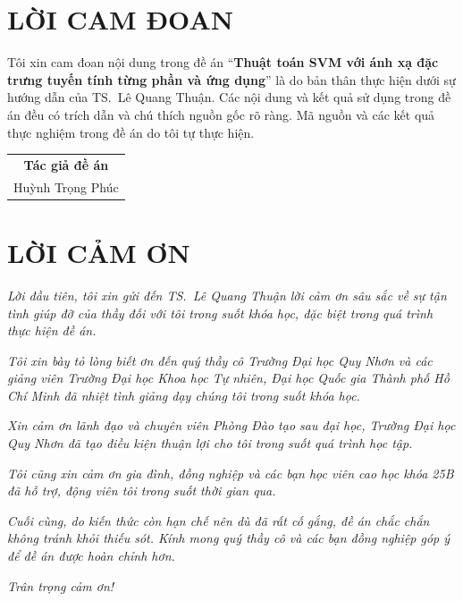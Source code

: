 \chapter*{LỜI CAM ĐOAN}

Tôi xin cam đoan nội dung trong đề án “\textbf{Thuật toán SVM với ánh xạ đặc trưng tuyến tính từng phần và ứng dụng}” là do bản thân thực hiện dưới sự hướng dẫn của TS.~Lê Quang Thuận. Các nội dung và kết quả sử dụng trong đề án đều có trích dẫn và chú thích nguồn gốc rõ ràng. Mã nguồn và các kết quả thực nghiệm trong đề án do tôi tự thực hiện.

\vspace{1.5cm}
\begin{flushright}
\begin{tabular}{c}
\textbf{Tác giả đề án}\\[2.2cm]
Huỳnh Trọng Phúc
\end{tabular}
\end{flushright}

\chapter*{LỜI CẢM ƠN}

\textit{Lời đầu tiên, tôi xin gửi đến TS.~Lê Quang Thuận lời cảm ơn sâu sắc về sự tận tình giúp đỡ của thầy đối với tôi trong suốt khóa học, đặc biệt trong quá trình thực hiện đề án.}

\textit{Tôi xin bày tỏ lòng biết ơn đến quý thầy cô Trường Đại học Quy Nhơn và các giảng viên Trường Đại học Khoa học Tự nhiên, Đại học Quốc gia Thành phố Hồ Chí Minh đã nhiệt tình giảng dạy chúng tôi trong suốt khóa học.}

\textit{Xin cảm ơn lãnh đạo và chuyên viên Phòng Đào tạo sau đại học, Trường Đại học Quy Nhơn đã tạo điều kiện thuận lợi cho tôi trong suốt quá trình học tập.}

\textit{Tôi cũng xin cảm ơn gia đình, đồng nghiệp và các bạn học viên cao học khóa 25B đã hỗ trợ, động viên tôi trong suốt thời gian qua.}

\textit{Cuối cùng, do kiến thức còn hạn chế nên dù đã rất cố gắng, đề án chắc chắn không tránh khỏi thiếu sót. Kính mong quý thầy cô và các bạn đồng nghiệp góp ý để đề án được hoàn chỉnh hơn.}

\textit{Trân trọng cảm ơn!}
